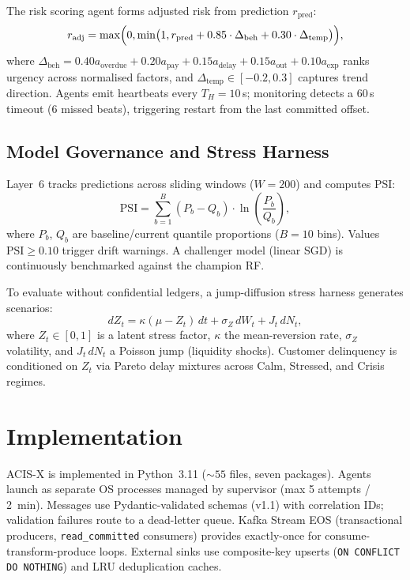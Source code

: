 \documentclass[pdflatex,sn-mathphys-num]{sn-jnl}
\theoremstyle{thmstyleone}
\theoremstyle{thmstyletwo}
\theoremstyle{thmstylethree}
\begin{document}
The risk scoring agent forms adjusted risk from prediction $r_{\text{pred}}$:
\begin{equation}
r_{\text{adj}}=\max\Bigl(0,\min\bigl(1,r_{\text{pred}}+0.85\cdot\Delta_{\text{beh}}+0.30\cdot\Delta_{\text{temp}}\bigr)\Bigr),
\label{eq:refinement}
\end{equation}
where $\Delta_{\text{beh}} = 0.40a_{\text{overdue}}{+}0.20a_{\text{pay}}{+}0.15a_{\text{delay}}{+}0.15a_{\text{out}}{+}0.10a_{\text{exp}}$ ranks urgency across normalised factors, and $\Delta_{\text{temp}}{\in}[-0.2,0.3]$ captures trend direction. Agents emit heartbeats every $T_H{=}10$\,s; monitoring detects a 60\,s timeout (6 missed beats), triggering restart from the last committed offset.

\subsection{Model Governance and Stress Harness}\label{subsec:governance}

Layer~6 tracks predictions across sliding windows ($W{=}200$) and computes PSI:
\begin{equation}
\text{PSI} = \sum_{b=1}^{B} (P_b - Q_b) \cdot \ln\!\left(\frac{P_b}{Q_b}\right),
\label{eq:psi}
\end{equation}
where $P_b$, $Q_b$ are baseline/current quantile proportions ($B{=}10$ bins). Values $\text{PSI} \ge 0.10$ trigger drift warnings. A challenger model (linear SGD) is continuously benchmarked against the champion RF.

To evaluate without confidential ledgers, a jump-diffusion stress harness generates scenarios:
\begin{equation}
dZ_t = \kappa (\mu - Z_t)\, dt + \sigma_Z\, dW_t + J_t\, dN_t,
\label{eq:jumpdiff}
\end{equation}
where $Z_t {\in} [0,1]$ is a latent stress factor, $\kappa$ the mean-reversion rate, $\sigma_Z$ volatility, and $J_t\,dN_t$ a Poisson jump (liquidity shocks). Customer delinquency is conditioned on $Z_t$ via Pareto delay mixtures across Calm, Stressed, and Crisis regimes.

\section{Implementation}\label{sec:implementation}

ACIS-X is implemented in Python~3.11 (${\sim}55$ files, seven packages). Agents launch as separate OS processes managed by supervisor (max 5 attempts / 2~min). Messages use Pydantic-validated schemas (v1.1) with correlation IDs; validation failures route to a dead-letter queue. Kafka Stream EOS (transactional producers, \texttt{read\_committed} consumers) provides exactly-once for consume-transform-produce loops. External sinks use composite-key upserts (\texttt{ON CONFLICT DO NOTHING}) and LRU deduplication caches.
\end{document}
